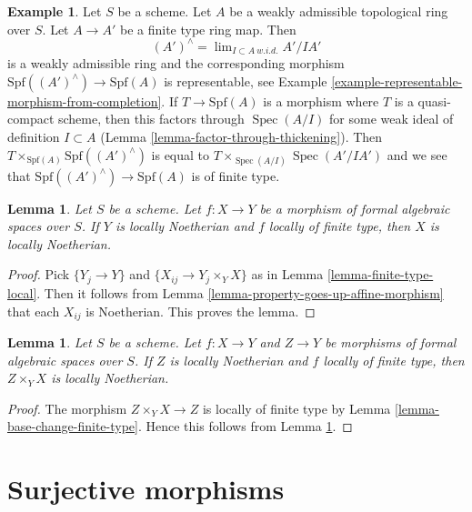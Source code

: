 \documentclass{stacks-project}
\theoremstyle{plain}
\newtheorem{lemma}[subsection]{Lemma}
\theoremstyle{definition}
\newtheorem{example}[subsection]{Example}
\theoremstyle{remark}
\numberwithin{equation}{subsection}
\def\lim{\mathop{\mathrm{lim}}\nolimits}
\def\Spec{\mathop{\mathrm{Spec}}}
\begin{document}
\begin{example}
\label{example-finite-type-from-finite-type-ring-map}
Let $S$ be a scheme. Let $A$ be a weakly admissible topological ring over $S$.
Let $A \to A'$ be a finite type ring map. Then
$$
(A')^\wedge = \lim_{I \subset A\ w.i.d.} A'/IA'
$$
is a weakly admissible ring and the corresponding morphism
$\text{Spf}((A')^\wedge) \to \text{Spf}(A)$ is representable,
see Example \ref{example-representable-morphism-from-completion}.
If $T \to \text{Spf}(A)$ is a morphism where $T$ is a quasi-compact
scheme, then this factors through $\Spec(A/I)$ for some weak
ideal of definition $I \subset A$ (Lemma \ref{lemma-factor-through-thickening}).
Then $T \times_{\text{Spf}(A)} \text{Spf}((A')^\wedge)$
is equal to $T \times_{\Spec(A/I)} \Spec(A'/IA')$ and
we see that $\text{Spf}((A')^\wedge) \to \text{Spf}(A)$ is
of finite type.
\end{example}

\begin{lemma}
\label{lemma-locally-finite-type-locally-noetherian}
Let $S$ be a scheme. Let $f : X \to Y$ be a morphism of
formal algebraic spaces over $S$. If $Y$ is locally Noetherian and
$f$ locally of finite type, then $X$ is locally Noetherian.
\end{lemma}

\begin{proof}
Pick $\{Y_j \to Y\}$ and $\{X_{ij} \to Y_j \times_Y X\}$
as in Lemma \ref{lemma-finite-type-local}. Then it follows
from Lemma \ref{lemma-property-goes-up-affine-morphism}
that each $X_{ij}$ is Noetherian. This proves the lemma.
\end{proof}

\begin{lemma}
\label{lemma-fibre-product-Noetherian}
Let $S$ be a scheme. Let $f : X \to Y$ and $Z \to Y$ be morphisms
of formal algebraic spaces over $S$. If $Z$ is locally
Noetherian and $f$ locally of finite type, then
$Z \times_Y X$ is locally Noetherian.
\end{lemma}

\begin{proof}
The morphism $Z \times_Y X \to Z$ is locally of finite type by
Lemma \ref{lemma-base-change-finite-type}. Hence this follows
from Lemma \ref{lemma-locally-finite-type-locally-noetherian}.
\end{proof}








\section{Surjective morphisms}
\label{section-surjective}
\end{document}
